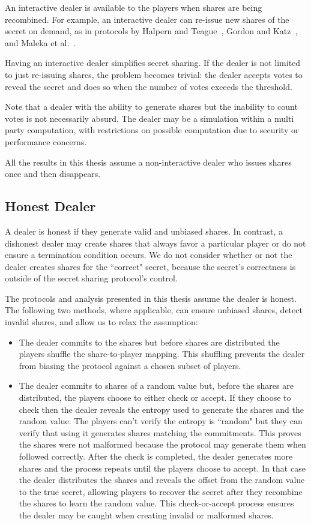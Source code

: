 \documentclass[12pt]{dalcsthesis}
\begin{document}
An interactive dealer is available to the players when shares are being recombined. For example, an interactive dealer can re-issue new shares of the secret on demand, as in protocols by Halpern and Teague~\cite{halpern04}, Gordon and Katz~\cite{gordon06}, and Maleka et al.~\cite{maleka08}.

Having an interactive dealer simplifies secret sharing. If the dealer is not limited to just re-issuing shares, the problem becomes trivial: the dealer accepts votes to reveal the secret and does so when the number of votes exceeds the threshold.

Note that a dealer with the ability to generate shares but the inability to count votes is not necessarily absurd. The dealer may be a simulation within a multi party computation, with restrictions on possible computation due to security or performance concerns.

All the results in this thesis assume a non-interactive dealer who issues shares once and then disappears.

\subsection{Honest Dealer}

A dealer is honest if they generate valid and unbiased shares. In contrast, a dishonest dealer may create shares that always favor a particular player or do not ensure a termination condition occurs. We do not consider whether or not the dealer creates shares for the ``correct" secret, because the secret's correctness is outside of the secret sharing protocol's control.

The protocols and analysis presented in this thesis assume the dealer is honest. The following two methods, where applicable, can ensure unbiased shares, detect invalid shares, and allow us to relax the assumption:

\begin{itemize}
  \item The dealer commits to the shares but before shares are distributed the players shuffle the share-to-player mapping. This shuffling prevents the dealer from biasing the protocol against a chosen subset of players.  
  \item The dealer commits to shares of a random value but, before the shares are distributed, the players choose to either check or accept. If they choose to check then the dealer reveals the entropy used to generate the shares and the random value. The players can't verify the entropy is ``random" but they can verify that using it generates shares matching the commitments. This proves the shares were not malformed because the protocol may generate them when followed correctly. After the check is completed, the dealer generates more shares and the process repeats until the players choose to accept. In that case the dealer distributes the shares and reveals the offset from the random value to the true secret, allowing players to recover the secret after they recombine the shares to learn the random value. This check-or-accept process ensures the dealer may be caught when creating invalid or malformed shares. 
\end{itemize}
\end{document}
